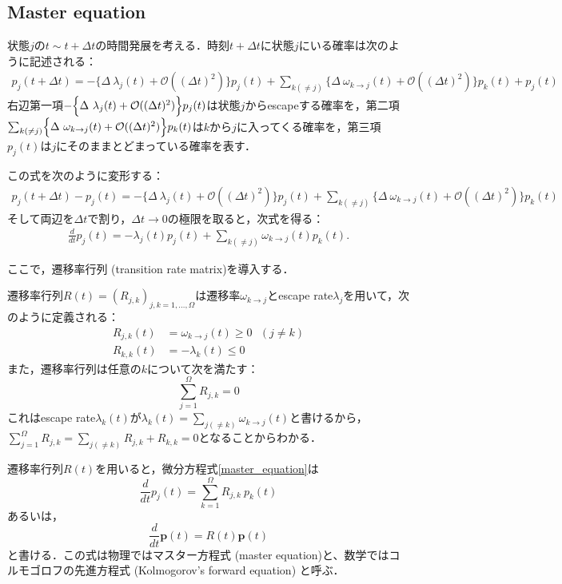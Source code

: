 \subsection{Master equation}
状態$j$の$t\sim t+\Delta t$の時間発展を考える．時刻$t+\Delta t$に状態$j$にいる確率は次のように記述される：
\begin{align}
    p_j(t+\Delta t) 
    = -\Biggl\{
    \Delta\ \lambda_j(t) + \mathcal{O}((\Delta t)^2)
    \Biggr\}p_j(t)
    +\sum_{k(\neq j)}
    \Biggl\{
    \Delta\ \omega_{k\to j}(t) + \mathcal{O}((\Delta t)^2)
    \Biggr\}p_k(t)
    +p_j(t)
\end{align}
右辺第一項$-\Bigl\{\Delta\ \lambda_j(t) + \mathcal{O}((\Delta t)^2)\Bigr\}p_j(t)$は状態$j$からescapeする確率を，第二項$\sum_{k(\neq j)}\Bigl\{\Delta\ \omega_{k\to j}(t) + \mathcal{O}((\Delta t)^2)
\Bigr\}p_k(t)$は$k$から$j$に入ってくる確率を，第三項$p_j(t)$は$j$にそのままとどまっている確率を表す．

この式を次のように変形する：
\begin{align}
    p_j(t+\Delta t) - p_j(t)
    = -\Biggl\{
    \Delta\ \lambda_j(t) + \mathcal{O}((\Delta t)^2)
    \Biggr\}p_j(t)
    +\sum_{k(\neq j)}
    \Biggl\{
    \Delta\ \omega_{k\to j}(t) + \mathcal{O}((\Delta t)^2)
    \Biggr\}p_k(t)
\end{align}
そして両辺を$\Delta t$で割り，$\Delta t \to 0$の極限を取ると，次式を得る：
\begin{align}\label{master_equation}
    \frac{d}{dt}p_j(t)
    = -\lambda_j(t)p_j(t)
    +\sum_{k(\neq j)}\omega_{k\to j}(t) p_k(t).
\end{align}

ここで，遷移率行列 (transition rate matrix)を導入する．
\begin{kotak}
	\begin{definition}
	遷移率行列$R(t)=(R_{j,k})_{j,k=1,\ldots,\Omega}$は遷移率$\omega_{k\to j}$とescape rate$\lambda_j$を用いて，次のように定義される：
	\begin{align}
	    R_{j,k}(t) &= \omega_{k\to j}(t) \geq 0\ \ \ (j\neq k)\\[10pt]
	    R_{k,k}(t) &= -\lambda_{k}(t) \leq 0
	\end{align}
	また，遷移率行列は任意の$k$について次を満たす：
	\begin{equation}
	    \sum_{j=1}^{\Omega}R_{j,k} = 0
	\end{equation}
	これはescape rate$\lambda_k(t)$が$\lambda_k(t) = \sum_{j(\neq k)}\omega_{k\to j}(t)$と書けるから，$\sum_{j=1}^{\Omega}R_{j,k} =\sum_{j(\neq k)}R_{j,k} + R_{k,k} = 0$となることからわかる．
	\end{definition}
\end{kotak}
遷移率行列$R(t)$を用いると，微分方程式\eqref{master_equation}は
\begin{equation}
    \frac{d}{dt}p_j(t)
    = \sum_{k = 1}^{\Omega}R_{j,k}\ p_{k}(t)
\end{equation}
あるいは，
\begin{equation}
    \frac{d}{dt}\bm{p}(t)
    = R(t) \bm{p}(t)
\end{equation}
と書ける．この式は物理ではマスター方程式 (master equation)と、数学ではコルモゴロフの先進方程式 (Kolmogorov's forward equation) と呼ぶ．
